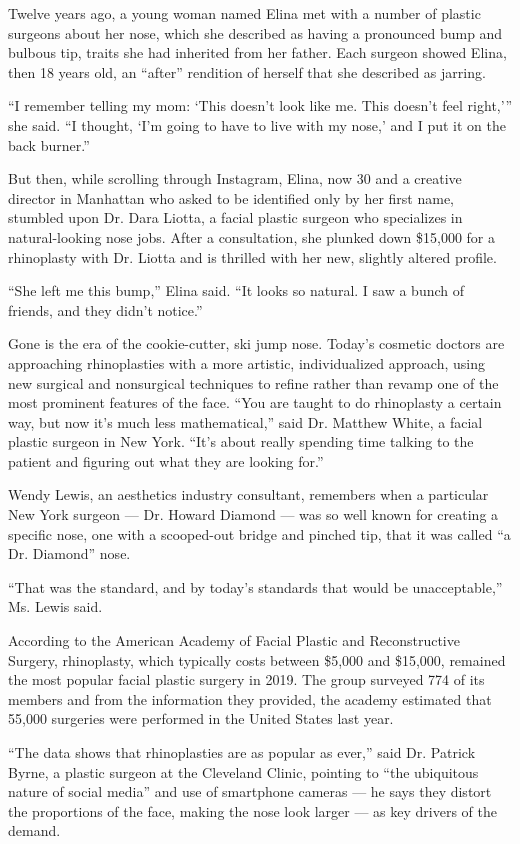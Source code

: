 Twelve years ago, a young woman named Elina met with a number of plastic
surgeons about her nose, which she described as having a pronounced bump
and bulbous tip, traits she had inherited from her father. Each surgeon
showed Elina, then 18 years old, an ``after'' rendition of herself that
she described as jarring.

``I remember telling my mom: `This doesn't look like me. This doesn't
feel right,''' she said. ``I thought, `I'm going to have to live with my
nose,' and I put it on the back burner.''

But then, while scrolling through Instagram, Elina, now 30 and a
creative director in Manhattan who asked to be identified only by her
first name, stumbled upon Dr. Dara Liotta, a facial plastic surgeon who
specializes in natural-looking nose jobs. After a consultation, she
plunked down \$15,000 for a rhinoplasty with Dr. Liotta and is thrilled
with her new, slightly altered profile.

``She left me this bump,'' Elina said. ``It looks so natural. I saw a
bunch of friends, and they didn't notice.''

Gone is the era of the cookie-cutter, ski jump nose. Today's cosmetic
doctors are approaching rhinoplasties with a more artistic,
individualized approach, using new surgical and nonsurgical techniques
to refine rather than revamp one of the most prominent features of the
face. ``You are taught to do rhinoplasty a certain way, but now it's
much less mathematical,'' said Dr. Matthew White, a facial plastic
surgeon in New York. ``It's about really spending time talking to the
patient and figuring out what they are looking for.''

Wendy Lewis, an aesthetics industry consultant, remembers when a
particular New York surgeon --- Dr. Howard Diamond --- was so well known
for creating a specific nose, one with a scooped-out bridge and pinched
tip, that it was called ``a Dr. Diamond'' nose.

``That was the standard, and by today's standards that would be
unacceptable,'' Ms. Lewis said.

According to the American Academy of Facial Plastic and Reconstructive
Surgery, rhinoplasty, which typically costs between \$5,000 and
\$15,000, remained the most popular facial plastic surgery in 2019. The
group surveyed 774 of its members and from the information they
provided, the academy estimated that 55,000 surgeries were performed in
the United States last year.

``The data shows that rhinoplasties are as popular as ever,'' said Dr.
Patrick Byrne, a plastic surgeon at the Cleveland Clinic, pointing to
``the ubiquitous nature of social media'' and use of smartphone cameras
--- he says they distort the proportions of the face, making the nose
look larger --- as key drivers of the demand.

